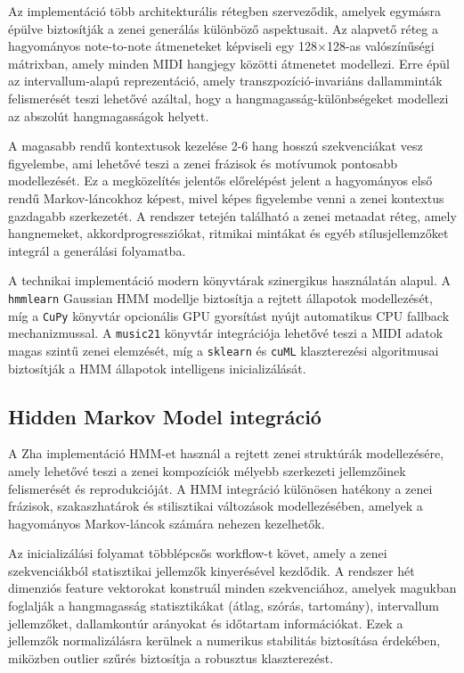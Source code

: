 Az implementáció több architekturális rétegben szerveződik, amelyek egymásra épülve biztosítják a zenei generálás különböző aspektusait. Az alapvető réteg a hagyományos note-to-note átmeneteket képviseli egy 128×128-as valószínűségi mátrixban, amely minden MIDI hangjegy közötti átmenetet modellezi. Erre épül az intervallum-alapú reprezentáció, amely transzpozíció-invariáns dallamminták felismerését teszi lehetővé azáltal, hogy a hangmagasság-különbségeket modellezi az abszolút hangmagasságok helyett.

A magasabb rendű kontextusok kezelése 2-6 hang hosszú szekvenciákat vesz figyelembe, ami lehetővé teszi a zenei frázisok és motívumok pontosabb modellezését. Ez a megközelítés jelentős előrelépést jelent a hagyományos első rendű Markov-láncokhoz képest, mivel képes figyelembe venni a zenei kontextus gazdagabb szerkezetét. A rendszer tetején található a zenei metaadat réteg, amely hangnemeket, akkordprogressziókat, ritmikai mintákat és egyéb stílusjellemzőket integrál a generálási folyamatba.

A technikai implementáció modern könyvtárak szinergikus használatán alapul. A \texttt{hmmlearn} Gaussian HMM modellje biztosítja a rejtett állapotok modellezését, míg a \texttt{CuPy} könyvtár opcionális GPU gyorsítást nyújt automatikus CPU fallback mechanizmussal. A \texttt{music21} könyvtár integrációja lehetővé teszi a MIDI adatok magas szintű zenei elemzését, míg a \texttt{sklearn} és \texttt{cuML} klaszterezési algoritmusai biztosítják a HMM állapotok intelligens inicializálását.

\subsection{Hidden Markov Model integráció}

A Zha implementáció HMM-et használ a rejtett zenei struktúrák modellezésére, amely lehetővé teszi a zenei kompozíciók mélyebb szerkezeti jellemzőinek felismerését és reprodukcióját. A HMM integráció különösen hatékony a zenei frázisok, szakaszhatárok és stilisztikai változások modellezésében, amelyek a hagyományos Markov-láncok számára nehezen kezelhetők.

Az inicializálási folyamat többlépcsős workflow-t követ, amely a zenei szekvenciákból statisztikai jellemzők kinyerésével kezdődik. A rendszer hét dimenziós feature vektorokat konstruál minden szekvenciához, amelyek magukban foglalják a hangmagasság statisztikákat (átlag, szórás, tartomány), intervallum jellemzőket, dallamkontúr arányokat és időtartam információkat. Ezek a jellemzők normalizálásra kerülnek a numerikus stabilitás biztosítása érdekében, miközben outlier szűrés biztosítja a robusztus klaszterezést.

